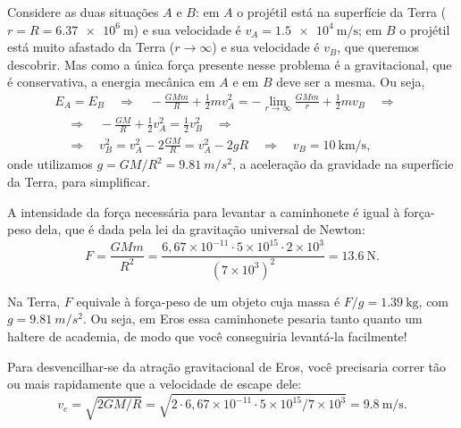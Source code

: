 \documentclass[a4paper]{article}
\newcommand\myrightarrow{\quad\Rightarrow\quad}
\begin{document}
\begin{resolucoes}
  \begin{exercicio}
   Considere as duas situações $A$ e $B$: em $A$ o projétil está na superfície da Terra ($r = R = \SI{6.37e6}{\metre}$) e sua velocidade é $v_A = \SI{1.5e4}{\metre\per\second}$;
  em $B$ o projétil está muito afastado da Terra ($r \to \infty$) e sua velocidade é $v_B$, que queremos descobrir.
  Mas como a única força presente nesse problema é a gravitacional, que é conservativa, a energia mecânica em $A$ e em $B$ deve ser a mesma.
  Ou seja,
  \begin{gather*}
  E_A = E_B \myrightarrow -\frac{GMm}{R} + \frac{1}{2}mv_A^2 = -\lim_{r\to\infty}\frac{GMm}{r} + \frac{1}{2}mv_B \myrightarrow\\
  \myrightarrow -\frac{GM}{R} + \frac{1}{2}v_A^2 = \frac{1}{2}v_B^2 \myrightarrow\\
  \myrightarrow v_B^2 = v_A^2 - 2\frac{GM}{R} = v_A^2 - 2gR \myrightarrow v_B = \SI{10}{\kilo\metre\per\second},
  \end{gather*}
  onde utilizamos $g = GM/R^2 = \SI{9.81}{m/s^2}$, a aceleração da gravidade na superfície da Terra, para simplificar.
  \end{exercicio}
  
  \begin{exercicio}
  
  \begin{compactenum}[(a)]
  \item A intensidade da força necessária para levantar a caminhonete é igual à força-peso dela, que é dada pela lei da gravitação universal de Newton:
  \begin{equation*}
  F = \frac{GMm}{R^2} = \frac{6,67\times10^{-11}\cdot 5\times10^{15}\cdot 2\times10^{3}}{\left(7\times10^{3}\right)^2} = \SI{13.6}{\newton}.
  \end{equation*}
  
  Na Terra, $F$ equivale à força-peso de um objeto cuja massa é $F/g = \SI{1.39}{\kilo\gram}$, com $g = \SI{9.81}{m/s^2}$.
  Ou seja, em Eros essa caminhonete pesaria tanto quanto um haltere de academia, de modo que você conseguiria levantá-la facilmente!
  
  \item Para desvencilhar-se da atração gravitacional de Eros, você precisaria correr tão ou mais rapidamente que a velocidade de escape dele:
  \begin{equation*}
  v_e = \sqrt{2GM/R} = \sqrt{{2\cdot 6,67\times10^{-11}\cdot 5\times10^{15}}/{7\times10^{3}}} = \SI{9.8}{\metre\per\second}.
  \end{equation*}
  

\end{compactenum}
\end{exercicio}
\end{resolucoes}
\end{document}
